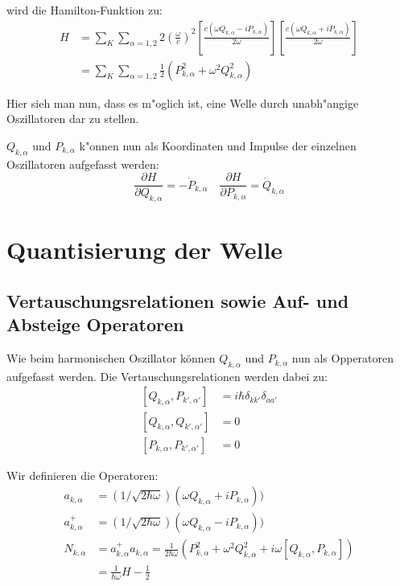 wird die Hamilton-Funktion zu:
\begin{equation} \label{fq:hamilton}
\begin{split}
H &= \sum_K \sum_{\alpha=1,2} 2 \left(\frac{\omega}{c}\right)^2 \left[ \frac{c(\omega Q_{k,\alpha} - i P_{k,\alpha})}{2 \omega} \right] \left[ \frac{c(\omega Q_{k,\alpha} + i P_{k,\alpha})}{2 \omega} \right] \\
&= \sum_K \sum_{\alpha=1,2} \frac{1}{2} (P_{k,\alpha}^2 + \omega^2 Q_{k,\alpha}^2)
\end{split}
\end{equation}

Hier sieh man nun, dass es m"oglich ist, eine Welle durch unabh"angige Oszillatoren dar zu stellen.

$Q_{k,\alpha}$ und $P_{k,\alpha}$ k"onnen nun als Koordinaten und Impulse der einzelnen Oszillatoren aufgefasst werden:
\begin{equation}
\dfrac{\partial H}{\partial Q_{k,\alpha}} = -\dot{P}_{k,\alpha} \quad \dfrac{\partial H}{\partial P_{k,\alpha}} = \dot{Q}_{k,\alpha}
\end{equation}

\section{Quantisierung der Welle}

\subsection{Vertauschungsrelationen sowie Auf- und Absteige Operatoren}
Wie beim harmonischen Oszillator können $Q_{k,\alpha}$ und $P_{k,\alpha}$ nun als Opperatoren aufgefasst werden. Die Vertauschungsrelationen werden dabei zu:
\begin{equation}
\begin{split}
[Q_{k,\alpha}, P_{k',\alpha'}] &= i \hbar \delta_{kk'}\delta_{aa'} \\
[Q_{k,\alpha}, Q_{k',\alpha'}] &= 0 \\
[P_{k,\alpha}, P_{k',\alpha'}] &= 0
\end{split}
\end{equation}

Wir definieren die Operatoren:
\begin{equation}
\begin{split}
a_{k,\alpha} &= (1/\sqrt{2 \hbar \omega})(\omega Q_{k,\alpha} + iP_{k,\alpha})) \\
a^+_{k,\alpha} &= (1/\sqrt{2 \hbar \omega})(\omega Q_{k,\alpha} - iP_{k,\alpha}))\\
N_{k,\alpha} &= a^+_{k,\alpha} a_{k,\alpha} = \frac{1}{2 \hbar \omega} (P_{k,\alpha}^2 + \omega^2 Q_{k,\alpha}^2 + i\omega [Q_{k,\alpha},P_{k,\alpha}] ) \\
 &= \frac{1}{ \hbar \omega } H - \frac{1}{2}
\end{split}
\end{equation}

